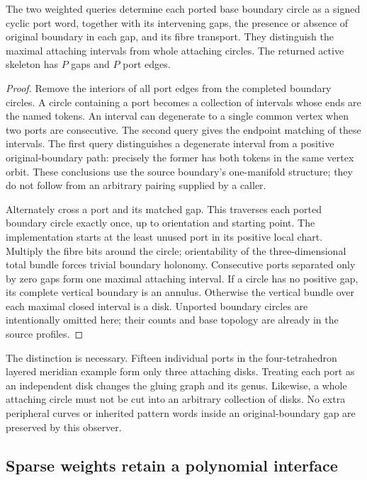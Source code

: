 \begin{proposition}
\label{marked-cut:skeleton}
The two weighted queries determine each ported base boundary circle as a
signed cyclic port word, together with its intervening gaps, the presence
or absence of original boundary in each gap, and its fibre transport.
They distinguish the maximal attaching intervals from whole attaching
circles. The returned active skeleton has $P$ gaps and $P$ port edges.
\end{proposition}
\begin{proof}
Remove the interiors of all port edges from the completed boundary circles.
A circle containing a port becomes a collection of intervals whose ends
are the named tokens. An interval can degenerate to a single common vertex
when two ports are consecutive. The second query gives the endpoint
matching of these intervals. The first query distinguishes a degenerate
interval from a positive original-boundary path: precisely the former has
both tokens in the same vertex orbit. These conclusions use the source
boundary's one-manifold structure; they do not follow from an arbitrary
pairing supplied by a caller.

Alternately cross a port and its matched gap. This traverses each ported
boundary circle exactly once, up to orientation and starting point. The
implementation starts at the least unused port in its positive local
chart. Multiply the fibre bits around the circle; orientability of the
three-dimensional total bundle forces trivial boundary holonomy. Consecutive
ports separated only by zero gaps form one maximal attaching interval.
If a circle has no positive gap, its complete vertical boundary is an
annulus. Otherwise the vertical bundle over each maximal closed interval
is a disk. Unported boundary circles are intentionally omitted here; their
counts and base topology are already in the source profiles.
\end{proof}

The distinction is necessary. Fifteen individual ports in the four-tetrahedron
layered meridian example form only three attaching disks. Treating each
port as an independent disk changes the gluing graph and its genus. Likewise,
a whole attaching circle must not be cut into an arbitrary collection of
disks. No extra peripheral curves or inherited pattern words inside an
original-boundary gap are preserved by this observer.

\subsection{Sparse weights retain a polynomial interface}

